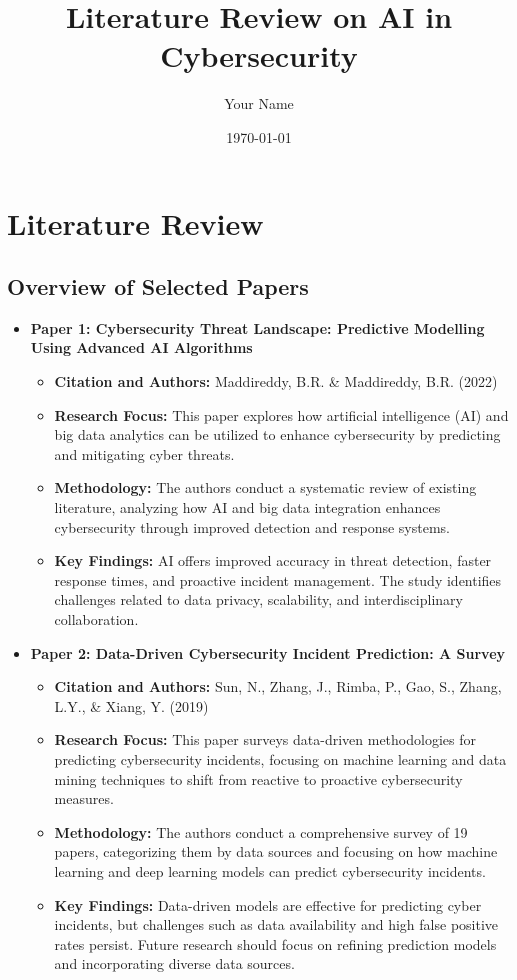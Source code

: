 \documentclass[12pt]{article}
\title{Literature Review on AI in Cybersecurity}
\author{Your Name}
\date{\today}
\begin{document}
\maketitle

\section{Literature Review}

\subsection{Overview of Selected Papers}

\begin{itemize}
    \item \textbf{Paper 1: Cybersecurity Threat Landscape: Predictive Modelling Using Advanced AI Algorithms}
    \begin{itemize}
        \item \textbf{Citation and Authors:} Maddireddy, B.R. \& Maddireddy, B.R. (2022)
        \item \textbf{Research Focus:} This paper explores how artificial intelligence (AI) and big data analytics can be utilized to enhance cybersecurity by predicting and mitigating cyber threats.
        \item \textbf{Methodology:} The authors conduct a systematic review of existing literature, analyzing how AI and big data integration enhances cybersecurity through improved detection and response systems.
        \item \textbf{Key Findings:} AI offers improved accuracy in threat detection, faster response times, and proactive incident management. The study identifies challenges related to data privacy, scalability, and interdisciplinary collaboration.
    \end{itemize}
    
    \item \textbf{Paper 2: Data-Driven Cybersecurity Incident Prediction: A Survey}
    \begin{itemize}
        \item \textbf{Citation and Authors:} Sun, N., Zhang, J., Rimba, P., Gao, S., Zhang, L.Y., \& Xiang, Y. (2019)
        \item \textbf{Research Focus:} This paper surveys data-driven methodologies for predicting cybersecurity incidents, focusing on machine learning and data mining techniques to shift from reactive to proactive cybersecurity measures.
        \item \textbf{Methodology:} The authors conduct a comprehensive survey of 19 papers, categorizing them by data sources and focusing on how machine learning and deep learning models can predict cybersecurity incidents.
        \item \textbf{Key Findings:} Data-driven models are effective for predicting cyber incidents, but challenges such as data availability and high false positive rates persist. Future research should focus on refining prediction models and incorporating diverse data sources.
    \end{itemize}
    

\end{itemize}
\end{document}
